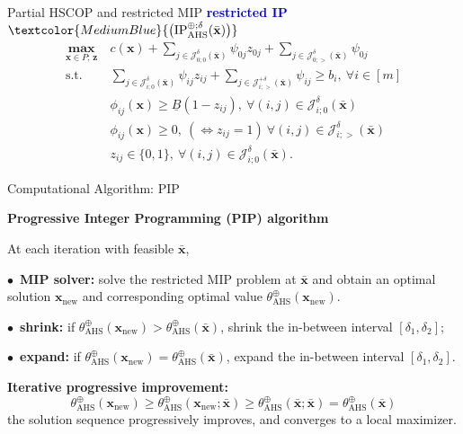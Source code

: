 \documentclass[aspectratio=169,xcolor=dvipsnames]{beamer}
\begin{document}
\begin{frame}{Partial HSCOP and restricted MIP}
  \textcolor{MediumBlue}{\textbf{restricted IP}}
  $\textcolor{MediumBlue}{\bigl(\mathrm{IP}^{\oplus;\delta}_{\mathrm{AHS}}
    (\bar{\mathbf{x}})\bigr)}$
  \[
    \begin{aligned}
      \operatorname*{\textbf{max}}_{\mathbf{x}\in P;\,\mathbf{z}}\
      &c(\mathbf{x})
        +\sum_{j\in\mathcal{J}^\delta_{0;0}(\bar{\mathbf{x}})}\psi_{0j}z_{0j}
        +\sum_{j\in\mathcal{J}^\delta_{0;>}(\bar{\mathbf{x}})}\psi_{0j}\\
      \text{s.t.}\
      &\sum_{j\in\mathcal{J}^\delta_{i;0}(\bar{\mathbf{x}})}\psi_{ij}z_{ij}
        +\sum_{j\in\mathcal{J}^{+\delta}_{i;>}(\bar{\mathbf{x}})}\psi_{ij}
        \geq b_i,\ \forall i\in[m]\\
      &\phi_{ij}(\mathbf{x})\geq \underline{B}(1-z_{ij}),\
        \forall(i,j)\in\mathcal{J}^\delta_{i;0}(\bar{\mathbf{x}})\\
      &\phi_{ij}(\mathbf{x})\geq 0,\ (\Leftrightarrow z_{ij}=1)\
        \forall(i,j)\in\mathcal{J}^\delta_{i;>}(\bar{\mathbf{x}})\\
      &z_{ij}\in\{0,1\},\
        \forall(i,j)\in\mathcal{J}^\delta_{i;0}(\bar{\mathbf{x}}).
    \end{aligned}
  \]
\end{frame}

\begin{frame}{Computational Algorithm: PIP}
  \small
  \setlength{\parskip}{0.10cm}

  \textbf{Progressive Integer Programming (PIP) algorithm}

  At each iteration with feasible $\bar{\mathbf{x}}$,

  $\bullet$~\textbf{MIP solver:} solve the restricted MIP problem at
  $\bar{\mathbf{x}}$ and obtain an optimal solution $\mathbf{x}_{\mathrm{new}}$
  and corresponding optimal value
  $\theta^{\oplus}_{\mathrm{AHS}}(\mathbf{x}_{\mathrm{new}})$.

  $\bullet$~\textbf{shrink:} if $\theta^{\oplus}_{\mathrm{AHS}}
  (\mathbf{x}_{\mathrm{new}})>\theta^{\oplus}_{\mathrm{AHS}}(\bar{\mathbf{x}})$,
  shrink the in-between interval $[\delta_1,\delta_2]$;

  $\bullet$~\textbf{expand:} if $\theta^{\oplus}_{\mathrm{AHS}}
  (\mathbf{x}_{\mathrm{new}})=\theta^{\oplus}_{\mathrm{AHS}}(\bar{\mathbf{x}})$,
  expand the in-between interval $[\delta_1,\delta_2]$.

  \textbf{Iterative progressive improvement:}
  \[
    \theta^{\oplus}_{\mathrm{AHS}}(\mathbf{x}_{\mathrm{new}})
    \geq\theta^{\oplus}_{\mathrm{AHS}}(\mathbf{x}_{\mathrm{new}};\bar{\mathbf{x}})
    \geq\theta^{\oplus}_{\mathrm{AHS}}(\bar{\mathbf{x}};\bar{\mathbf{x}})
    =\theta^{\oplus}_{\mathrm{AHS}}(\bar{\mathbf{x}})
  \]
  the solution sequence progressively improves, and converges to a local
  maximizer.
\end{frame}
\end{document}
